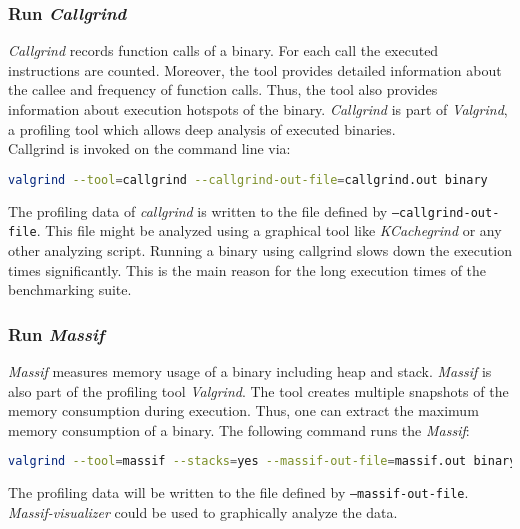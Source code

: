 \subsubsection{Run \textit{Callgrind}}
\textit{Callgrind} records function calls of a binary. For each call the executed instructions are counted. Moreover, the tool provides detailed information about the callee and frequency of function calls. Thus, the tool also provides information about execution hotspots of the binary. \textit{Callgrind} is part of \textit{Valgrind}, a profiling tool which allows deep analysis of executed binaries.\\
Callgrind is invoked on the command line via:
\begin{lstlisting}[language=Bash]
valgrind --tool=callgrind --callgrind-out-file=callgrind.out binary
\end{lstlisting}
The profiling data of \textit{callgrind} is written to the file defined by \texttt{--callgrind-out-file}. This file might be analyzed using a graphical tool like \textit{KCachegrind} or any other analyzing script.
Running a binary using callgrind slows down the execution times significantly. This is the main reason for the long execution times of the benchmarking suite. 

\subsubsection{Run \textit{Massif}}
\textit{Massif} measures memory usage of a binary including heap and stack. \textit{Massif} is also part of the profiling tool \textit{Valgrind}. The tool creates multiple snapshots of the memory consumption during execution. Thus, one can extract the maximum memory consumption of a binary. The following command runs the \textit{Massif}:
\begin{lstlisting}[language=Bash]
valgrind --tool=massif --stacks=yes --massif-out-file=massif.out binary
\end{lstlisting}
The profiling data will be written to the file defined by \texttt{--massif-out-file}. \textit{Massif-visualizer} could be used to graphically analyze the data.

